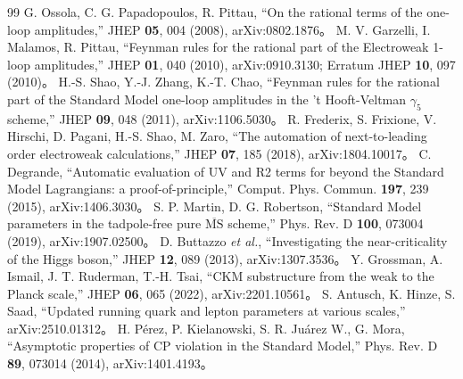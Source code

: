 \documentclass[a4paper,10pt]{ltjsarticle}
\begin{document}
\begin{thebibliography}{99}
 G. Ossola, C. G. Papadopoulos, R. Pittau, ``On the rational terms of the one-loop amplitudes,'' JHEP \textbf{05}, 004 (2008), arXiv:0802.1876。
 M. V. Garzelli, I. Malamos, R. Pittau, ``Feynman rules for the rational part of the Electroweak 1-loop amplitudes,'' JHEP \textbf{01}, 040 (2010), arXiv:0910.3130; Erratum JHEP \textbf{10}, 097 (2010)。
 H.-S. Shao, Y.-J. Zhang, K.-T. Chao, ``Feynman rules for the rational part of the Standard Model one-loop amplitudes in the 't Hooft-Veltman $\gamma_5$ scheme,'' JHEP \textbf{09}, 048 (2011), arXiv:1106.5030。
 R. Frederix, S. Frixione, V. Hirschi, D. Pagani, H.-S. Shao, M. Zaro, ``The automation of next-to-leading order electroweak calculations,'' JHEP \textbf{07}, 185 (2018), arXiv:1804.10017。
 C. Degrande, ``Automatic evaluation of UV and R2 terms for beyond the Standard Model Lagrangians: a proof-of-principle,'' Comput. Phys. Commun. \textbf{197}, 239 (2015), arXiv:1406.3030。
 S. P. Martin, D. G. Robertson, ``Standard Model parameters in the tadpole-free pure $\overline{\mathrm{MS}}$ scheme,'' Phys. Rev. D \textbf{100}, 073004 (2019), arXiv:1907.02500。
 D. Buttazzo \textit{et al.}, ``Investigating the near-criticality of the Higgs boson,'' JHEP \textbf{12}, 089 (2013), arXiv:1307.3536。
 Y. Grossman, A. Ismail, J. T. Ruderman, T.-H. Tsai, ``CKM substructure from the weak to the Planck scale,'' JHEP \textbf{06}, 065 (2022), arXiv:2201.10561。
 S. Antusch, K. Hinze, S. Saad, ``Updated running quark and lepton parameters at various scales,'' arXiv:2510.01312。
 H. Pérez, P. Kielanowski, S. R. Juárez W., G. Mora, ``Asymptotic properties of CP violation in the Standard Model,'' Phys. Rev. D \textbf{89}, 073014 (2014), arXiv:1401.4193。
\end{thebibliography}
\end{document}
